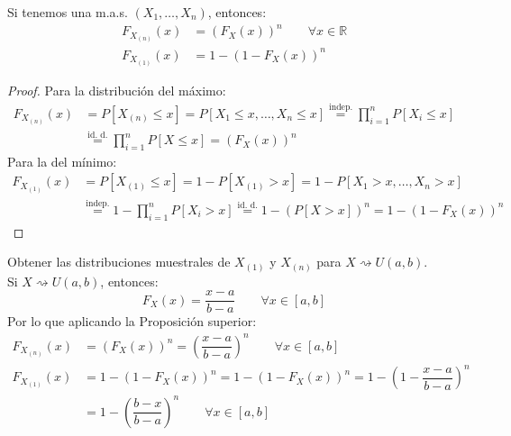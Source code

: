 \begin{prop}
    Si tenemos una m.a.s. $(X_1, \ldots, X_n)$, entonces:
    \begin{align*}
        F_{X_{(n)}}(x) &= {(F_X(x))}^{n} \qquad \forall x\in \mathbb{R} \\
        F_{X_{(1)}}(x) &= 1-{(1-F_X(x))}^{n}
    \end{align*}
    \begin{proof}
        Para la distribución del máximo:
        \begin{align*}
            F_{X_{(n)}}(x) &= P[X_{(n)} \leq x] = P[X_1 \leq x, \ldots, X_n \leq x] \stackrel{\text{indep.}}{=} \prod_{i=1}^{n} P[X_i \leq x] \\ &\stackrel{\text{id. d.}}{=} \prod_{i=1}^{n} P[X\leq x] = {(F_X(x))}^{n}
        \end{align*}
        Para la del mínimo:
        \begin{align*}
            F_{X_{(1)}}(x) &= P[X_{(1)}\leq x] = 1-P[X_{(1)} > x] = 1-P[X_1 > x, \ldots, X_n > x] \\ &\stackrel{\text{indep.}}{=} 1 - \prod_{i=1}^{n}P[X_i > x] \stackrel{\text{id. d.}}{=} 1-{(P[X>x])}^{n} = 1-{(1-F_X(x))}^{n}
        \end{align*}
    \end{proof}
\end{prop}

\begin{ejercicio}
    Obtener las distribuciones muestrales de $X_{(1)}$ y  $X_{(n)}$ para \newline $X\rightsquigarrow U(a,b)$.\\

    \noindent
    Si $X\rightsquigarrow U(a,b)$, entonces:
    \begin{equation*}
        F_X(x) = \dfrac{x-a}{b-a} \qquad \forall x\in [a,b]
    \end{equation*}
    Por lo que aplicando la Proposición superior:
    \begin{align*}
        F_{X_{(n)}}(x) &= {(F_X(x))}^{n} = {\left(\dfrac{x-a}{b-a}\right)}^{n} \qquad \forall x\in [a,b] \\
        F_{X_{(1)}}(x) &= 1 - {(1-F_X(x))}^{n} = 1-{(1-F_X(x))}^{n} = 1-{\left(1-\dfrac{x-a}{b-a}\right)}^{n} \\
                       &= 1-{\left(\dfrac{b-x}{b-a}\right)}^{n} \qquad \forall x\in [a,b]
    \end{align*}
\end{ejercicio}

